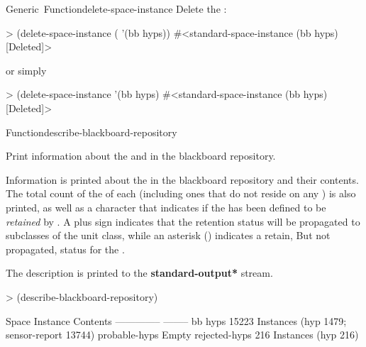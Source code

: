 \documentclass[10pt,twoside,english,pdftex]{article}
\begin{document}
\begin{functiondoc}{Generic~Function}{delete-space-instance}
\fnexamples
{}%
Delete the  :
%
\W\supp
\begin{example}
> (delete-space-instance ( '(bb hyps))
#<standard-space-instance (bb hyps) [Deleted]>
\end{example}
%
or simply
%
\W\supp\notpretop
\begin{example}
> (delete-space-instance '(bb hyps)
#<standard-space-instance (bb hyps) [Deleted]>
\end{example}

\end{functiondoc}


\begin{functiondoc}{Function}{describe-blackboard-repository}{\noargs}

\fnsyntax

\fnpurpose {}%
%
%
Print information about the  and  in the
blackboard repository.

\fnpackage {}

\fnmodule {}

\fndescription
{}%
%
Information is printed about the  in the blackboard
repository and their contents.  The total count of the
 of each  (including ones that
do not reside on any ) is also printed, as well
as a character that indicates if the  has been
defined to be \textit{retained} by
\textbf{}.  A plus sign
indicates that the retention status will be propagated to subclasses
of the unit class, while an asterisk (\code{*}) indicates a retain,
But not propagated, status for the .

The description is printed to the {\bf *standard-output*} stream.

\fnexample
%
\W\supp
\begin{example}
> (describe-blackboard-repository)

Space Instance                Contents
--------------                --------
bb                            
   hyps                       15223 Instances (hyp 1479; sensor-report 13744)
   probable-hyps              Empty
   rejected-hyps              216 Instances (hyp 216)


\end{example}
\end{functiondoc}
\end{document}
